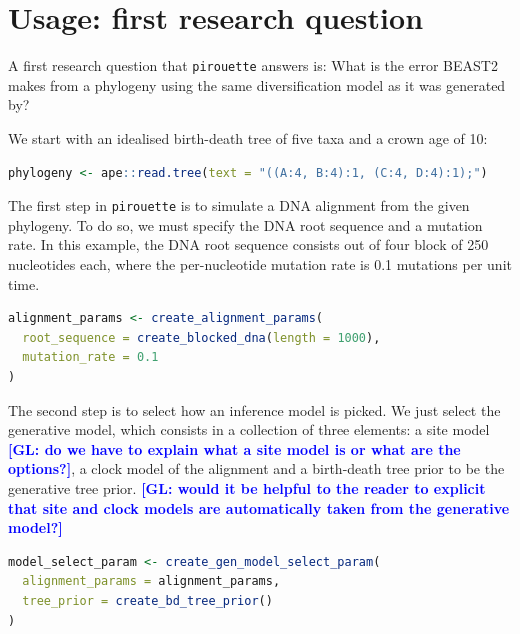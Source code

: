 \documentclass{article}
\newcommand{\giovanni}[1]{\textcolor{blue}{\textbf{[GL: #1]}}}
\begin{document}
\section{Usage: first research question}

A first research question that \verb;pirouette; answers is:
What is the error BEAST2 makes from a phylogeny using the same 
diversification model as it was generated by?

We start with an idealised birth-death tree of five taxa and a crown age of 10:

\begin{lstlisting}[language=R, floatplacement=H]
phylogeny <- ape::read.tree(text = "((A:4, B:4):1, (C:4, D:4):1);")
\end{lstlisting}

The first step in \verb;pirouette; is to simulate a DNA alignment from the 
given phylogeny. To do so, we must specify the DNA root sequence
and a mutation rate. In this example, the DNA root sequence consists
out of four block of 250 nucleotides each, where the per-nucleotide
mutation rate is 0.1 mutations per unit time.

\begin{lstlisting}[language=R, floatplacement=H]
alignment_params <- create_alignment_params(
  root_sequence = create_blocked_dna(length = 1000),
  mutation_rate = 0.1
)
\end{lstlisting}

The second step is to select how an inference model is picked.
We just select the generative model, which consists in a collection of 
three elements: a site model \giovanni{do we have to explain what a site model is or what are the options?}, a clock
model of the alignment and a birth-death tree prior
to be the generative tree prior. \giovanni{would it be helpful to the reader to explicit that site and clock models are automatically taken from the generative model?}

\begin{lstlisting}[language=R, floatplacement=H]
model_select_param <- create_gen_model_select_param(
  alignment_params = alignment_params,
  tree_prior = create_bd_tree_prior()
)
\end{lstlisting}
\end{document}

